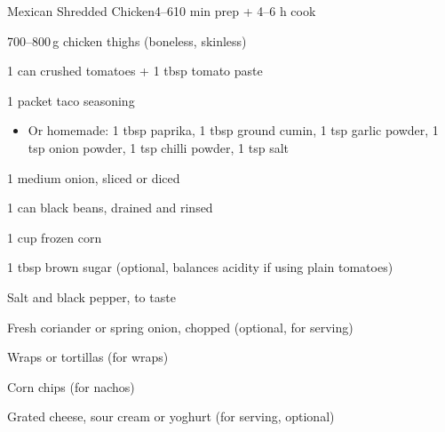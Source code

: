 \begin{recipebox}{Mexican Shredded Chicken}{4--6}{10 min prep + 4--6 h cook}
  \begin{ingredients}
    \item 700--800\,g chicken thighs (boneless, skinless)
    \item 1 can crushed tomatoes + 1 tbsp tomato paste
    \item 1 packet taco seasoning
      \begin{itemize}
        \item Or homemade: 1 tbsp paprika, 1 tbsp ground cumin,
        1 tsp garlic powder, 1 tsp onion powder,
        1 tsp chilli powder, 1 tsp salt
      \end{itemize}
    \item 1 medium onion, sliced or diced
    \item 1 can black beans, drained and rinsed
    \item 1 cup frozen corn
    \item 1 tbsp brown sugar (optional, balances acidity if using plain tomatoes)
    \item Salt and black pepper, to taste
    \item Fresh coriander or spring onion, chopped (optional, for serving)
    \item Wraps or tortillas (for wraps)
    \item Corn chips (for nachos)
    \item Grated cheese, sour cream or yoghurt (for serving, optional)
  \end{ingredients}


\end{recipebox}
